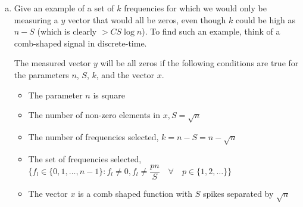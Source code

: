 \begin{enumerate}[(a)]
\item{Give an example of a set of $k$ frequencies for which we would only
  be measuring a $y$ vector that would all be zeros, even though $k$ could
  be high as $n-S$ (which is clearly $> CS \log n$). To find such an
  example, think of a comb-shaped signal in discrete-time.

The measured vector $y$ will be all zeros if the following conditions are true for the parameters $n$, $S$, $k$, and the vector $x$.
\begin{itemize}
\item{The parameter $n$ is square}
\item{The number of non-zero elements in $x,S = \sqrt{n}$}
\item{The number of frequencies selected, $k = n - S = n - \sqrt{n}$}
\item{The set of frequencies selected, $\{f_{l} \in \{0, 1, \ldots, n-1\} : f_{l} \neq 0, f_{l}\neq \dfrac{pn}{S} \quad \forall \quad p \in \{1,2,\ldots\}\}$}
\item{The vector $x$ is a comb shaped function with $S$ spikes separated by $\sqrt{n}$}
\end{itemize}

}
\end{enumerate}
